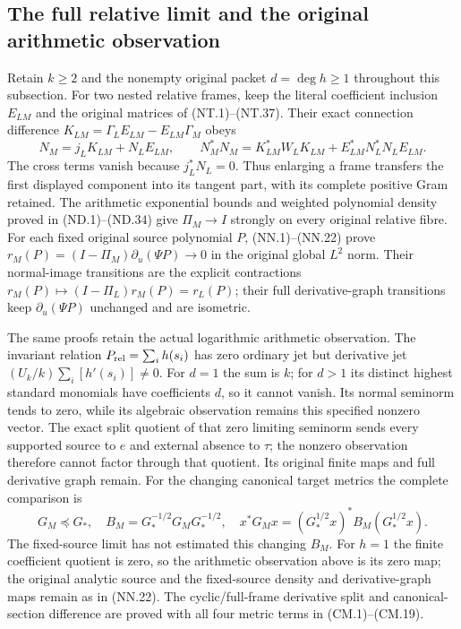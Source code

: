 \subsection{The full relative limit and the original arithmetic observation}

Retain $k\ge2$ and the nonempty original packet $d=\deg h\ge1$
throughout this subsection. For two nested relative frames, keep the literal coefficient inclusion
$E_{LM}$ and the original matrices of (NT.1)--(NT.37). Their exact
connection difference $K_{LM}=\Gamma_LE_{LM}-E_{LM}\Gamma_M$ obeys
\[
 N_M=j_LK_{LM}+N_LE_{LM},\qquad
 N_M^*N_M=K_{LM}^*W_LK_{LM}+E_{LM}^*N_L^*N_LE_{LM}.
 \tag{R26}
\]
The cross terms vanish because $j_L^*N_L=0$. Thus enlarging a frame
transfers the first displayed component into its tangent part, with its
complete positive Gram retained. The arithmetic exponential bounds and
weighted polynomial density proved in (ND.1)--(ND.34) give
$\Pi_M\to I$ strongly on every original relative fibre. For each fixed
original source polynomial $P$, (NN.1)--(NN.22) prove
$r_M(P)=(I-\Pi_M)\partial_u(\Psi P)\to0$ in the original global
$L^2$ norm. Their normal-image transitions are the explicit contractions
$r_M(P)\mapsto(I-\Pi_L)r_M(P)=r_L(P)$; their full derivative-graph
transitions keep $\partial_u(\Psi P)$ unchanged and are isometric.

The same proofs retain the actual logarithmic arithmetic observation.
The invariant relation $P_{\rm rel}=\sum_i h(s_i)$ has zero ordinary
jet but derivative jet $(U_k/k)\sum_i[h'(s_i)]\ne0$.
For $d=1$ the sum is $k$; for $d>1$ its distinct highest standard
monomials have coefficients $d$, so it cannot vanish. Its normal
seminorm tends to zero, while its algebraic observation remains this
specified nonzero vector. The exact split quotient of that zero limiting
seminorm sends every supported source to $e$ and external absence to
$\tau$; the nonzero observation therefore cannot factor through that
quotient. Its original finite maps and full derivative graph remain.
For the changing canonical target metrics the complete comparison is
\[
 G_M\preceq G_*,\quad
 B_M=G_*^{-1/2}G_MG_*^{-1/2},\quad
 x^*G_Mx=(G_*^{1/2}x)^*B_M(G_*^{1/2}x).
 \tag{R27}
\]
The fixed-source limit has not estimated this changing $B_M$.
For $h=1$ the finite coefficient quotient is zero, so the arithmetic
observation above is its zero map; the original analytic source and
the fixed-source density and derivative-graph maps remain as in (NN.22).
The cyclic/full-frame derivative split and canonical-section difference
are proved with all four metric terms in (CM.1)--(CM.19).

